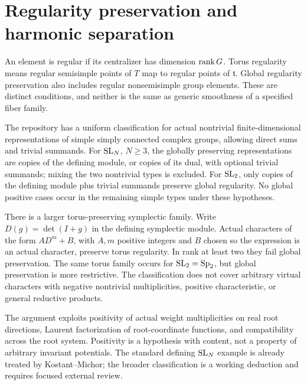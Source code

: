 \section{Regularity preservation and harmonic separation}
An element is regular if its centralizer has dimension $\operatorname{rank} G$. Torus regularity means regular semisimple points of $T$ map to regular points of $\mathfrak t$. Global regularity preservation also includes regular nonsemisimple group elements. These are distinct conditions, and neither is the same as generic smoothness of a specified fiber family.

The repository has a uniform classification for actual nontrivial finite-dimensional representations of simple simply connected complex groups, allowing direct sums and trivial summands. For $\operatorname{SL}_N$, $N\ge3$, the globally preserving representations are copies of the defining module, or copies of its dual, with optional trivial summands; mixing the two nontrivial types is excluded. For $\operatorname{SL}_2$, only copies of the defining module plus trivial summands preserve global regularity. No global positive cases occur in the remaining simple types under these hypotheses.

There is a larger torus-preserving symplectic family. Write $D(g)=\det(I+g)$ in the defining symplectic module. Actual characters of the form $A D^m+B$, with $A,m$ positive integers and $B$ chosen so the expression is an actual character, preserve torus regularity. In rank at least two they fail global preservation. The same torus family occurs for $\operatorname{SL}_2=\operatorname{Sp}_2$, but global preservation is more restrictive. The classification does not cover arbitrary virtual characters with negative nontrivial multiplicities, positive characteristic, or general reductive products.

The argument exploits positivity of actual weight multiplicities on real root directions, Laurent factorization of root-coordinate functions, and compatibility across the root system. Positivity is a hypothesis with content, not a property of arbitrary invariant potentials. The standard defining $\operatorname{SL}_N$ example is already treated by Kostant--Michor; the broader classification is a working deduction and requires focused external review.

